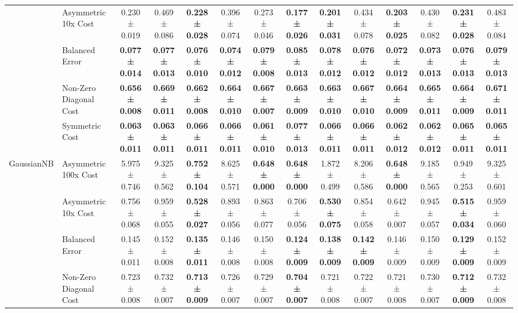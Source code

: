 \begin{table}[H]
{\begin{tabular}{llcccccccccccc}
 & Asymmetric 10x Cost & 0.230 ± 0.019 & 0.469 ± 0.086 & \textbf{0.228 ± 0.028} & 0.396 ± 0.074 & 0.273 ± 0.046 & \textbf{0.177 ± 0.026} & \textbf{0.201 ± 0.031} & 0.434 ± 0.078 & \textbf{0.203 ± 0.025} & 0.430 ± 0.082 & \textbf{0.231 ± 0.028} & 0.483 ± 0.084 \\
 & Balanced Error & \textbf{0.077 ± 0.014} & \textbf{0.077 ± 0.013} & \textbf{0.076 ± 0.010} & \textbf{0.074 ± 0.012} & \textbf{0.079 ± 0.008} & \textbf{0.085 ± 0.013} & \textbf{0.078 ± 0.012} & \textbf{0.076 ± 0.012} & \textbf{0.072 ± 0.012} & \textbf{0.073 ± 0.013} & \textbf{0.076 ± 0.013} & \textbf{0.079 ± 0.013} \\
 & Non-Zero Diagonal Cost & \textbf{0.656 ± 0.008} & \textbf{0.669 ± 0.011} & \textbf{0.662 ± 0.008} & \textbf{0.664 ± 0.010} & \textbf{0.667 ± 0.007} & \textbf{0.663 ± 0.009} & \textbf{0.663 ± 0.010} & \textbf{0.667 ± 0.010} & \textbf{0.664 ± 0.009} & \textbf{0.665 ± 0.011} & \textbf{0.664 ± 0.009} & \textbf{0.671 ± 0.011} \\
 & Symmetric Cost & \textbf{0.063 ± 0.011} & \textbf{0.063 ± 0.011} & \textbf{0.066 ± 0.011} & \textbf{0.066 ± 0.011} & \textbf{0.061 ± 0.010} & \textbf{0.077 ± 0.013} & \textbf{0.066 ± 0.011} & \textbf{0.066 ± 0.011} & \textbf{0.062 ± 0.012} & \textbf{0.062 ± 0.012} & \textbf{0.065 ± 0.011} & \textbf{0.065 ± 0.011} \\
\cline{1-14}
\multirow[t]{5}{*}{GaussianNB} & Asymmetric 100x Cost & 5.975 ± 0.746 & 9.325 ± 0.562 & \textbf{0.752 ± 0.104} & 8.625 ± 0.571 & \textbf{0.648 ± 0.000} & \textbf{0.648 ± 0.000} & 1.872 ± 0.499 & 8.206 ± 0.586 & \textbf{0.648 ± 0.000} & 9.185 ± 0.565 & 0.949 ± 0.253 & 9.325 ± 0.601 \\
 & Asymmetric 10x Cost & 0.756 ± 0.068 & 0.959 ± 0.055 & \textbf{0.528 ± 0.027} & 0.893 ± 0.056 & 0.863 ± 0.077 & 0.706 ± 0.056 & \textbf{0.530 ± 0.075} & 0.854 ± 0.058 & 0.642 ± 0.007 & 0.945 ± 0.057 & \textbf{0.515 ± 0.034} & 0.959 ± 0.060 \\
 & Balanced Error & 0.145 ± 0.011 & 0.152 ± 0.008 & \textbf{0.135 ± 0.011} & 0.146 ± 0.008 & 0.150 ± 0.008 & \textbf{0.124 ± 0.009} & \textbf{0.138 ± 0.009} & \textbf{0.142 ± 0.009} & 0.146 ± 0.009 & 0.150 ± 0.009 & \textbf{0.129 ± 0.009} & 0.152 ± 0.009 \\
 & Non-Zero Diagonal Cost & 0.723 ± 0.008 & 0.732 ± 0.007 & \textbf{0.713 ± 0.009} & 0.726 ± 0.007 & 0.729 ± 0.007 & \textbf{0.704 ± 0.007} & 0.721 ± 0.008 & 0.722 ± 0.007 & 0.721 ± 0.008 & 0.730 ± 0.007 & \textbf{0.712 ± 0.009} & 0.732 ± 0.008 \\

\end{tabular}}
\end{table}
